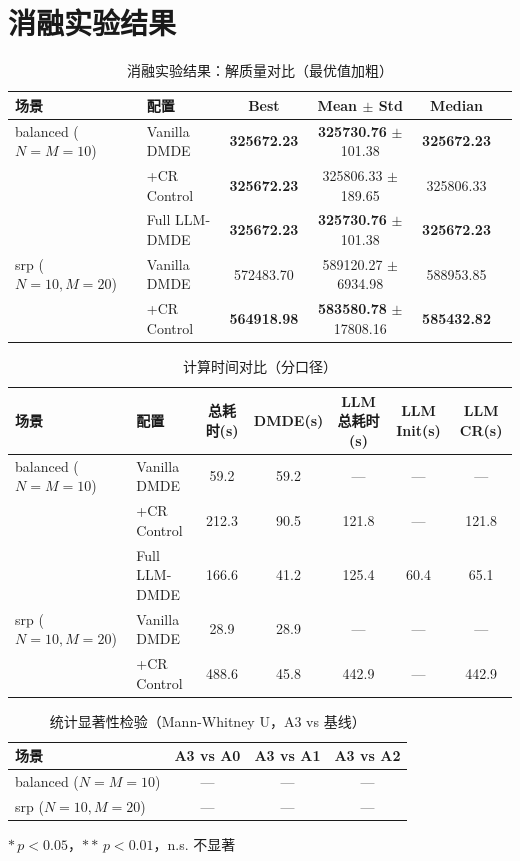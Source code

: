 \documentclass{article}
\begin{document}
\section*{消融实验结果}

\begin{table}[htbp]
\centering
\caption{消融实验结果：解质量对比（最优值加粗）}
\label{tab:ablation_results}
\begin{tabular}{llcccc}
\toprule
场景 & 配置 & Best & Mean $\pm$ Std & Median \\
\midrule
balanced ($N=M=10$) & Vanilla DMDE & \textbf{325672.23} & \textbf{325730.76} $\pm$ 101.38 & \textbf{325672.23} \\
 & +CR Control & \textbf{325672.23} & 325806.33 $\pm$ 189.65 & 325806.33 \\
 & Full LLM-DMDE & \textbf{325672.23} & \textbf{325730.76} $\pm$ 101.38 & \textbf{325672.23} \\
\midrule
srp ($N=10, M=20$) & Vanilla DMDE & 572483.70 & 589120.27 $\pm$ 6934.98 & 588953.85 \\
 & +CR Control & \textbf{564918.98} & \textbf{583580.78} $\pm$ 17808.16 & \textbf{585432.82} \\
\bottomrule
\end{tabular}
\end{table}

\begin{table}[htbp]
\centering
\caption{计算时间对比（分口径）}
\label{tab:time_breakdown}
\begin{tabular}{llccccc}
\toprule
场景 & 配置 & 总耗时(s) & DMDE(s) & LLM总耗时(s) & LLM Init(s) & LLM CR(s) \\
\midrule
balanced ($N=M=10$) & Vanilla DMDE & 59.2 & 59.2 & --- & --- & --- \\
 & +CR Control & 212.3 & 90.5 & 121.8 & --- & 121.8 \\
 & Full LLM-DMDE & 166.6 & 41.2 & 125.4 & 60.4 & 65.1 \\
\midrule
srp ($N=10, M=20$) & Vanilla DMDE & 28.9 & 28.9 & --- & --- & --- \\
 & +CR Control & 488.6 & 45.8 & 442.9 & --- & 442.9 \\
\bottomrule
\end{tabular}
\end{table}

\begin{table}[htbp]
\centering
\caption{统计显著性检验（Mann-Whitney U，A3 vs 基线）}
\label{tab:mannwhitney}
\begin{tabular}{lccc}
\toprule
场景 & A3 vs A0 & A3 vs A1 & A3 vs A2 \\
\midrule
balanced ($N=M=10$) & --- & --- & --- \\
srp ($N=10, M=20$) & --- & --- & --- \\
\bottomrule
\end{tabular}

\footnotesize{$*\, p<0.05$，$**\, p<0.01$，n.s. 不显著}
\end{table}
\end{document}

